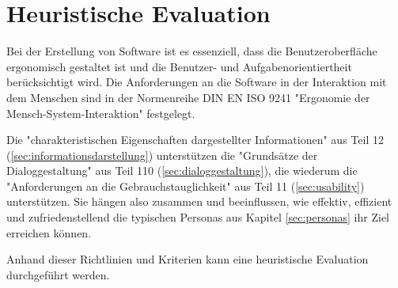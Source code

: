 \section{Heuristische Evaluation} \label{sec:evulation}

Bei der Erstellung von Software ist es essenziell, dass die Benutzeroberfläche ergonomisch gestaltet ist und die Benutzer- und Aufgabenorientiertheit berücksichtigt wird. Die Anforderungen an die Software in der Interaktion mit dem Menschen sind in der Normenreihe DIN EN ISO 9241 "Ergonomie der Mensch-System-Interaktion" festgelegt. 

Die "charakteristischen Eigenschaften dargestellter Informationen" aus Teil 12 (\ref{sec:informationsdarstellung}) unterstützen die "Grundsätze der Dialoggestaltung" aus Teil 110 (\ref{sec:dialoggestaltung}), die wiederum die "Anforderungen an die Gebrauchstauglichkeit" aus Teil 11 (\ref{sec:usability}) unterstützen. Sie hängen also zusammen und beeinflussen, wie effektiv, effizient und zufriedenstellend die typischen Personas aus Kapitel \ref{sec:personas} ihr Ziel erreichen können.

Anhand dieser Richtlinien und Kriterien kann eine heuristische Evaluation durchgeführt werden.



